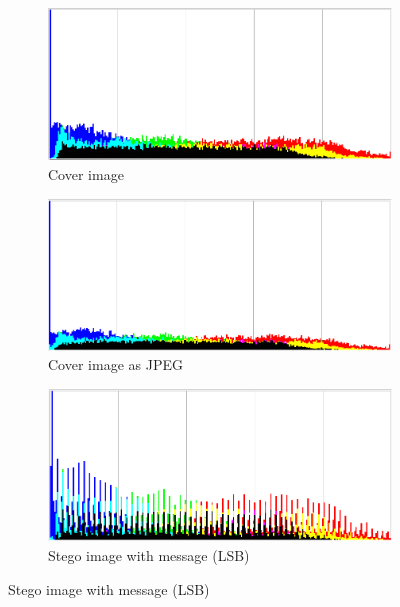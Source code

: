 \begin{figure}
    \centering
    \begin{subfigure}[b]{0.49\textwidth}
        \includegraphics[width=\textwidth]{figures/tiger_smallHisto.png}
            \caption{Cover image}
            \label{fig:coverHisto}
    \end{subfigure}
    \begin{subfigure}[b]{0.49\textwidth}
            \includegraphics[width=\textwidth]{figures/gtOut2Histo.png}
            \caption{Cover image as JPEG}
            \label{fig:gt2Histo}
    \end{subfigure}
    \begin{subfigure}[b]{0.49\textwidth}
            \includegraphics[width=\textwidth]{figures/lsbOutHisto.png}
            \caption{Stego image with message (LSB)}
            \label{fig:lsbHisto}

\end{subfigure}
\end{figure}
